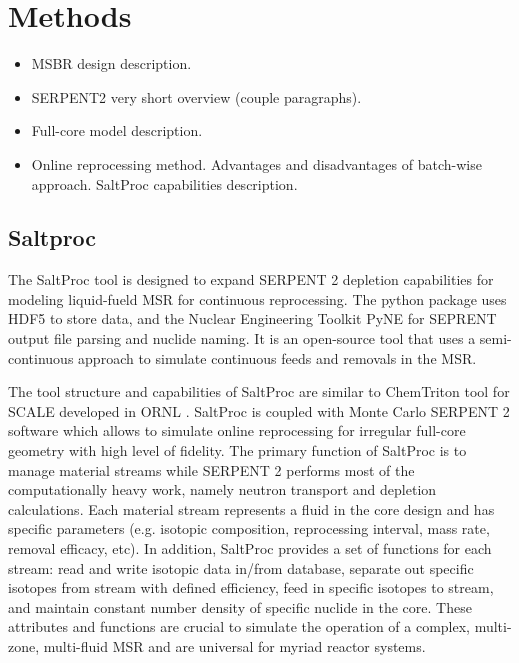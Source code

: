 
\section{Methods}


\begin{itemize}
        \item \gls{MSBR} design description.
	\item SERPENT2 very short overview (couple paragraphs).
	\item Full-core model description.
	\item Online reprocessing method. Advantages and disadvantages of batch-wise approach. SaltProc capabilities description.
\end{itemize}

\subsection{Saltproc}

The SaltProc tool is designed to expand SERPENT 2 depletion capabilities for modeling liquid-fueld \gls{MSR} for continuous reprocessing.
The python package uses HDF5 \cite{the_hdf_group_hierarchial_1997} to store data, and the Nuclear Engineering Toolkit PyNE \cite{scopatz_pyne:_2012}
for SEPRENT output file parsing and nuclide naming. It is an open-source tool that uses a semi-continuous approach to 
simulate continuous feeds and removals in the \gls{MSR}.

The tool structure and capabilities of SaltProc are similar to ChemTriton tool for SCALE developed in \gls{ORNL} \cite{powers_new_2013}.
SaltProc is coupled with Monte Carlo SERPENT 2 software which allows to simulate online reprocessing for irregular full-core geometry with high level of fidelity.  The primary function of SaltProc is to manage material streams while SERPENT 2 performs most of the computationally heavy work, namely neutron transport and depletion calculations. Each material stream represents a fluid in the core design and has specific parameters (e.g. isotopic composition, reprocessing interval, mass rate, removal efficacy, etc). In addition, SaltProc provides a set of functions for each stream: read and write isotopic data in/from database, separate out specific isotopes from stream with defined efficiency, feed in specific isotopes to stream, and maintain constant number density of specific nuclide in the core. These attributes and functions are crucial to simulate the operation of a complex, multi-zone, multi-fluid \gls{MSR} and are universal for myriad reactor systems.

